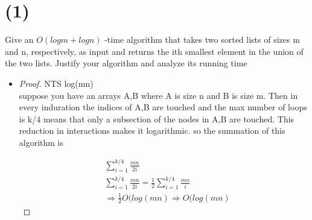 \documentclass[12pt]{article}
\begin{document}
\maketitle
{}

\section*{(1)}	
	Give an $O(log m + log n)$ -time algorithm that takes two sorted lists of sizes m and n,
respectively, as input and returns the ith smallest element in the union of the two lists.
Justify your algorithm and analyze its running time
\begin{itemize}
\begin{algorithm}
\SetAlgoLined
 initialization(Array a, Array b, k)\;
	a$\_$index $\gets \frac{k}{2}$ - 1\;
	b$\_$index  $\gets$ k - a$\_$index-2\;
	  count$\gets \frac{k}{4}$\;
 \caption{ith smallest element}
\end{algorithm}
\item
\begin{proof}
NTS log(mn)\\
	suppose you have an arrays A,B where A is size n  and B is size m. Then in every induration the indices of A,B are touched and the max number of loops is k/4 means that only a subsection of the nodes in A,B are touched. This reduction in interactions makes it logarithmic. so the summation of this algorithm is
	
	\begin{align*}
		&\sum_{i=1}^{k/4}\frac{mn}{2i}\\
		&\sum_{i=1}^{k/4}\frac{mn}{2i} = \frac{1}{2} \sum_{i=1}^{k/4}\frac{mn}{i}\\
		&\Rightarrow \frac{1}{2}O(log(mn) \Rightarrow O(log(mn) 
	\end{align*}
	
\end{proof}

\end{itemize}
\end{document}
